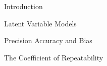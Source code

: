 Introduction

Latent Variable Models

Precision Accuracy and Bias


The Coefficient of Repeatability
